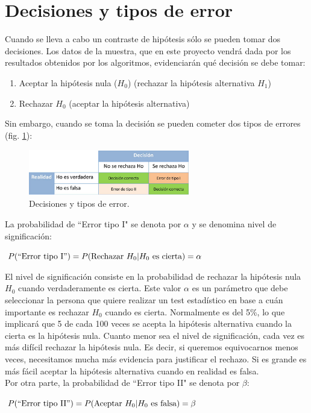 \section{Decisiones y tipos de error} \label{tipos_error}
Cuando se lleva a cabo un contraste de hipótesis sólo se pueden tomar dos decisiones. Los datos de la muestra,
que en este proyecto vendrá dada por los resultados obtenidos por los algoritmos, evidenciarán qué decisión se
debe tomar:
\begin{enumerate}
\item Aceptar la hipótesis nula ($H_0$) (rechazar la hipótesis alternativa $H_1$)
\item Rechazar $H_0$ (aceptar la hipótesis alternativa)
\end{enumerate}
Sin embargo, cuando se toma la decisión se pueden cometer dos tipos de errores (fig. \ref{fig:decision}):
\begin{figure}[H]
\centering
\includegraphics[width=7cm,height=2cm]{figuras/tipos_error.png}
\caption{Decisiones y tipos de error.}
\label{fig:decision}
\end{figure}
La probabilidad de ``Error tipo I" se denota por $\alpha$ y se denomina nivel de significación:
\begin{center}
$P(\mbox{``Error tipo I}") = P(\mbox{Rechazar } H_0|H_0 \mbox{ es cierta}) =\alpha$
\end{center}
El nivel de significación consiste en la probabilidad de rechazar la hipótesis nula $H_0$ cuando verdaderamente
es cierta. Este valor $\alpha$ es un parámetro que debe seleccionar la persona que quiere realizar un test
estadístico en base a cuán importante es rechazar $H_0$ cuando es cierta. Normalmente es del 5\%, lo
que implicará que 5 de cada 100 veces se acepta la hipótesis alternativa cuando la cierta es la hipótesis nula.
Cuanto menor sea el nivel de significación, cada vez es más difícil rechazar la hipótesis nula. Es decir, si
queremos equivocarnos menos veces, necesitamos mucha más evidencia para justificar el rechazo. Si es grande es
más fácil aceptar la hipótesis alternativa cuando en realidad es falsa.
\\Por otra parte, la probabilidad de ``Error tipo II" se denota por $\beta$:
\begin{center}
$P(\mbox{``Error tipo II}") = P(\mbox{Aceptar } H_0|H_0 \mbox{ es falsa}) =\beta$
\end{center}
